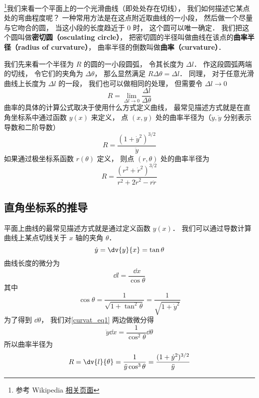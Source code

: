 

\footnote{参考 Wikipedia \href{https://en.wikipedia.org/wiki/Curvature}{相关页面}}我们来看一个平面上的一个光滑曲线（即处处存在切线）， 我们如何描述它某点处的弯曲程度呢？ 一种常用方法是在这点附近取曲线的一小段， 然后做一个尽量与它吻合的圆， 当这小段的长度趋近于 0 时， 这个圆可以唯一确定． 我们把这个圆叫做\textbf{密切圆（osculating circle）}， 把密切圆的半径叫做曲线在该点的\textbf{曲率半径（radius of curvature）}， 曲率半径的倒数叫做\textbf{曲率（curvature）}．

我们先来看一个半径为 $R$ 的圆的一小段圆弧， 令其长度为 $\Delta l$． 作这段圆弧两端的切线， 令它们的夹角为 $\Delta \theta$， 那么显然满足 $R \Delta\theta = \Delta l$． 同理， 对于任意光滑曲线上长度为 $\Delta l$ 的一段， 我们也可以做相同的处理， 但需要令 $\Delta l \to 0$
\begin{equation}\label{curvat_eq3}
R = \lim_{\Delta l \to 0} \frac{\Delta l}{\Delta \theta}
\end{equation}
曲率的具体的计算公式取决于使用什么方式定义曲线， 最常见描述方式就是在直角坐标系中通过函数 $y(x)$ 来定义， 点 $(x, y)$ 处的曲率半径为（$\dot y, \ddot y$ 分别表示导数和二阶导数）
\begin{equation}
R = \frac{(1 + \dot y^2)^{3/2}}{\ddot y}
\end{equation}
如果通过极坐标系函数 $r(\theta)$ 定义， 则点 $(r, \theta)$ 处的曲率半径为
\begin{equation}
R = \frac{(r^2 + \dot r^2)^{3/2}}{r^2 + 2\dot r^2 - r\ddot r}
\end{equation}

\subsection{直角坐标系的推导}

平面上曲线的最常见描述方式就是通过定义函数 $y(x)$． 我们可以通过导数计算曲线上某点切线关于 $x$ 轴的夹角 $\theta$．
\begin{equation}\label{curvat_eq1}
\dot y = \dv{y}{x} = \tan \theta
\end{equation}
曲线长度的微分为
\begin{equation}
\dd{l} = \frac{\dd{x}}{\cos\theta}
\end{equation}
其中
\begin{equation}\label{curvat_eq2}
\cos\theta = \frac{1}{\sqrt{1 + \tan^2\theta}} = \frac{1}{\sqrt{1 + \dot y^2}}
\end{equation}
为了得到 $\dd{\theta}$， 我们对\autoref{curvat_eq1} 两边做微分得
\begin{equation}
\ddot y \dd{x} = \frac{1}{\cos^2\theta} \dd{\theta}
\end{equation}
所以曲率半径为
\begin{equation}
R = \dv{l}{\theta} = \frac{1}{\ddot y\cos^3\theta} = \frac{(1 + \dot y^2)^{3/2}}{\ddot y}
\end{equation}

